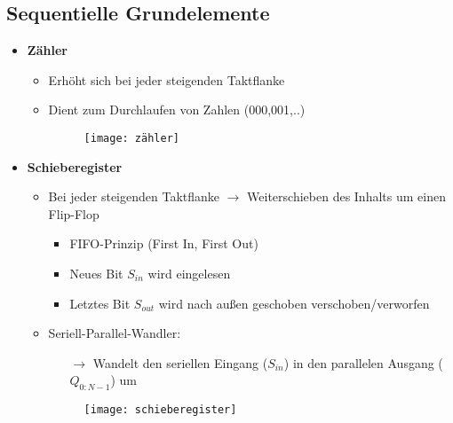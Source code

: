 \subsection{Sequentielle Grundelemente}
\begin{itemize}

\item \textbf{Zähler}
	\begin{itemize}
	\item Erhöht sich bei jeder steigenden Taktflanke
	\item Dient zum Durchlaufen von Zahlen (000,001,..)
	\item[]
		\begin{figure}[H]
		\begin{center}
		\texttt{[image: zähler]}
		\end{center}
		\end{figure}
	\end{itemize}
	
\item \textbf{Schieberegister}
	\begin{itemize}
	\item Bei jeder steigenden Taktflanke $\rightarrow$ Weiterschieben des Inhalts um einen Flip-Flop
		\begin{itemize}
		\item FIFO-Prinzip (First In, First Out)
		\item Neues Bit $S_{in}$ wird eingelesen
		\item Letztes Bit $S_{out}$ wird nach außen geschoben verschoben/verworfen
		\end{itemize}
	\item Seriell-Parallel-Wandler: 
		\begin{itemize}
		\item[$\rightarrow$] Wandelt den seriellen Eingang ($S_{in}$) in den parallelen Ausgang ($Q_{0:N-1}$) um
		\end{itemize}
		
	\item[]
		\begin{figure}[H]
		\begin{center}
		\texttt{[image: schieberegister]}
		\end{center}
		\end{figure}
	\end{itemize}


\end{itemize}
